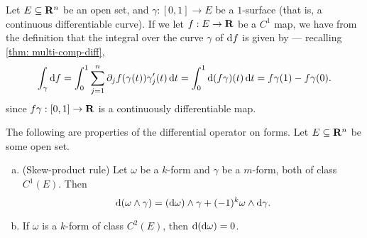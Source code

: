 \begin{example}
\label{exp:curve-integral}
Let \(E \subseteq \mathbf{R}^n\) be an open set, and \(\gamma: [0, 1] \to E\) be a
\(1\)-surface (that is, a continuous differentiable curve). If we let \(f: E \to
\mathbf{R}\) be a \(C^1\) map, we have from the definition that the integral over the
curve \(\gamma\) of \(\mathrm{d} f\) is given by --- recalling \cref{thm:
multi-comp-diff},
\[
  \int_{\gamma} \mathrm{d} f =
  \int_0^1 \sum_{j=1}^n \partial_j f (\gamma(t)) \gamma_j'(t)\, \mathrm{d} t
  = \int_0^1 \mathrm{d} (f \gamma)(t)\, \mathrm{d} t
  = f \gamma(1) - f \gamma(0).
\]
since \(f \gamma: [0, 1] \to \mathbf{R}\) is a continuously differentiable map.
\end{example}

\begin{theorem}
\label{thm:differential-operator-forms-properties}
The following are properties of the differential operator on forms. Let \(E
\subseteq \mathbf{R}^n\) be some open set.
\begin{enumerate}[(a)]\setlength\itemsep{0em}
\item (Skew-product rule) Let \(\omega\) be a \(k\)-form and \(\gamma\) be a
  \(m\)-form, both of class \(C^1(E)\). Then
  \[
    \mathrm{d} (\omega \wedge \gamma)
    = (\mathrm{d} \omega) \wedge \gamma + (-1)^k \omega \wedge \mathrm{d} \gamma.
  \]
\item If \(\omega\) is a \(k\)-form of class \(C^2(E)\), then \(\mathrm{d}(\mathrm{d}
  \omega) = 0\).
\end{enumerate}
\end{theorem}

